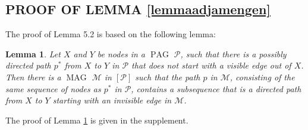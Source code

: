 \documentclass[]{article}
\DeclareMathOperator{\MAG}{MAG}
\DeclareMathOperator{\PAG}{PAG}
\newtheorem{lemma}[theorem]{Lemma}
\theoremstyle{definition}
\theoremstyle{remark}
\newcommand{\g}[1][G]{\mathcal{#1}}
\newcommand{\pstar}[1][p]{{#1}^{*}}
\begin{document}
\subsection{PROOF OF LEMMA \ref{lemmaadjamengen}}\label{sec: adjustment amenable proof}

The proof of Lemma 5.2 is based on the following lemma:

\begin{lemma}
 Let $X$ and $Y$ be nodes in a $\PAG$ $\g[P]$, such that there is a possibly directed path $\pstar$ from $X$ to $Y$ in $\g[P]$ that does not start with a visible edge out of $X$. Then there is a $\MAG$ $\g[M]$ in $[\g[P]]$ such that the path $p$ in $\g[M]$, consisting of the same sequence of nodes as $\pstar$ in $\g[P]$, contains a subsequence that is a directed path from $X$ to $Y$ starting with an invisible edge in $\g[M]$.
    \label{lemmadirectedpath}
\end{lemma}

The proof of Lemma \ref{lemmadirectedpath} is given in the supplement.
\end{document}
